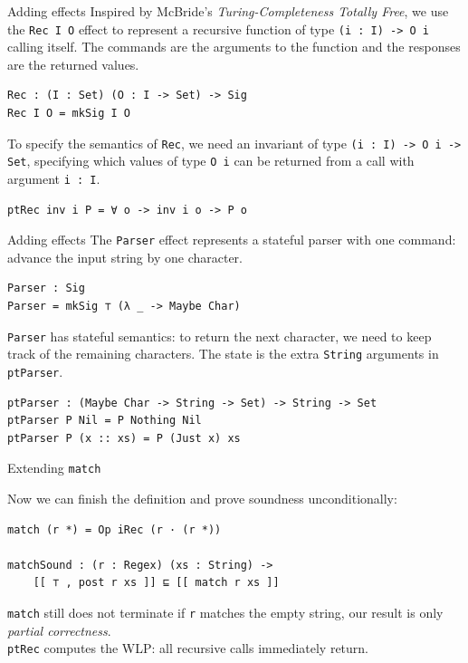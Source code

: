 \documentclass[ignorenonframetext,]{beamer}
\newcommand{\Agda}[1]{\texttt{#1}\xspace}
\newcommand{\match}{\Agda{match}}
\begin{document}
\begin{frame}[fragile]{Adding effects}
Inspired by McBride's \textit{Turing-Completeness Totally Free}, we use the \Agda{Rec I O} effect to represent a recursive function of type \Agda{(i : I) -> O i} calling itself.
The commands are the arguments to the function and the responses are the returned values.
\begin{verbatim}
Rec : (I : Set) (O : I -> Set) -> Sig
Rec I O = mkSig I O
\end{verbatim}
To specify the semantics of \Agda{Rec}, we need an invariant of type \Agda{(i : I) -> O i -> Set},
specifying which values of type \Agda{O i} can be returned from a call with argument \Agda{i : I}.
\begin{verbatim}
ptRec inv i P = ∀ o -> inv i o -> P o
\end{verbatim}
\end{frame}

\begin{frame}[fragile]{Adding effects}
The \Agda{Parser} effect represents a stateful parser with one command:
advance the input string by one character.

\begin{verbatim}
Parser : Sig
Parser = mkSig ⊤ (λ _ -> Maybe Char)
\end{verbatim}

\Agda{Parser} has stateful semantics: to return the next character, we need to keep track of the remaining characters.
The state is the extra \Agda{String} arguments in \Agda{ptParser}.
\begin{verbatim}
ptParser : (Maybe Char -> String -> Set) -> String -> Set
ptParser P Nil = P Nothing Nil
ptParser P (x :: xs) = P (Just x) xs
\end{verbatim}

\end{frame}

\begin{frame}[fragile]{Extending \match}

Now we can finish the definition and prove soundness unconditionally:
\begin{verbatim}
match (r *) = Op iRec (r · (r *))

matchSound : (r : Regex) (xs : String) ->
    [[ ⊤ , post r xs ]] ⊑ [[ match r xs ]]
\end{verbatim}

\pause
\match still does not terminate if \Agda{r} matches the empty string, our result is only \emph{partial correctness}.\\
\Agda{ptRec} computes the WLP: all recursive calls immediately return.
\end{frame}
\end{document}
